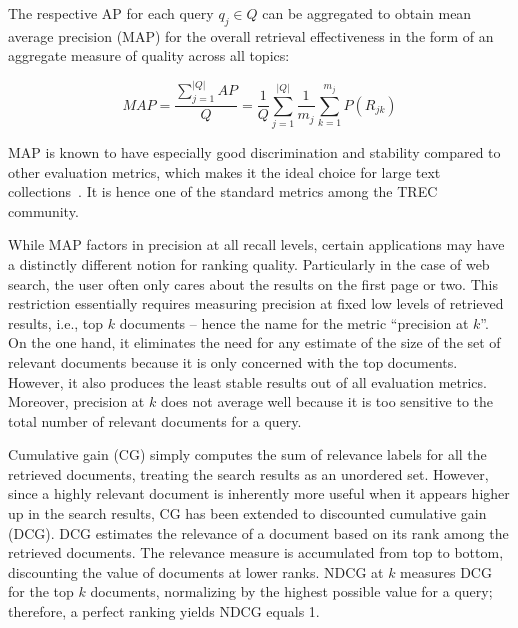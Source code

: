 The respective AP for each query $ q_{j} \in Q $ can be aggregated to obtain mean average precision (MAP) for the overall retrieval effectiveness in the form of an aggregate measure of quality across all topics:

\begin{equation}
MAP = \frac{\sum^{|Q|} _{j = 1} AP}{Q} = \frac{1}{Q} \sum^{|Q|} _{j = 1} \frac{1}{m_j} \sum^{m_j} _{k = 1} P(R_{jk})
\end{equation}


\noindent MAP is known to have especially good discrimination and stability compared to other evaluation metrics, which makes it the ideal choice for large text collections~\cite{manning2010introduction}.
It is hence one of the standard metrics among the TREC community.

\smallskip {}

While MAP factors in precision at all recall levels, certain applications may have a distinctly different notion for ranking quality.
Particularly in the case of web search, the user often only cares about the results on the first page or two.
This restriction essentially requires measuring precision at fixed low levels of retrieved results, i.e., top $ k $ documents -- hence the name for the metric ``precision at $ k $''.
On the one hand, it eliminates the need for any estimate of the size of the set of relevant documents because it is only concerned with the top documents.
However, it also produces the least stable results out of all evaluation metrics.
Moreover, precision at $ k $ does not average well because it is too sensitive to the total number of relevant documents for a query.

\smallskip {}

Cumulative gain (CG) simply computes the sum of relevance labels for all the retrieved documents, treating the search results as an unordered set.
However, since a highly relevant document is inherently more useful when it appears higher up in the search results, CG has been extended to discounted cumulative gain (DCG).
DCG estimates the relevance of a document based on its rank among the retrieved documents.
The relevance measure is accumulated from top to bottom, discounting the value of documents at lower ranks.
NDCG at $ k $ measures DCG for the top $ k $ documents, normalizing by the highest possible value for a query; therefore, a perfect ranking yields NDCG equals 1.

